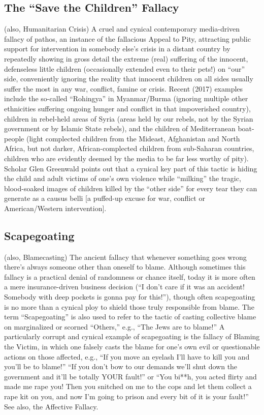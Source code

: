 \documentclass[10pt,a4paper,british]{article}
\begin{document}
\begin{multicols}{2}
    \subsection{The ``Save the Children'' Fallacy} (also, Humanitarian Crisis) A cruel and cynical contemporary media{-}driven fallacy of pathos, an instance of the fallacious Appeal to Pity, attracting public support for intervention in somebody else's crisis in a distant country by repeatedly showing in gross detail the extreme (real) suffering of the innocent, defenseless little children (occasionally extended even to their pets!) on ``our'' side, conveniently ignoring the reality that innocent children on all sides usually suffer the most in any war, conflict, famine or crisis.  Recent (2017) examples include the so{-}called ``Rohingya'' in Myanmar/Burma (ignoring multiple other ethnicities suffering ongoing hunger and conflict in that impoverished country), children in rebel{-}held areas of Syria (areas held by our rebels, not by the Syrian government or by Islamic State rebels), and the children of Mediterranean boat{-}people (light complected children from the Mideast, Afghanistan and North Africa, but not darker, African{-}complected children from sub{-}Saharan countries, children who are evidently deemed by the media to be far less worthy of pity). Scholar Glen Greenwald points out that a cynical key part of this tactic is hiding the child and adult victims of one's own violence while ``milking'' the tragic, blood{-}soaked images of children killed by the ``other side'' for every tear they can generate as a causus belli [a puffed{-}up excuse for war, conflict or American/Western intervention].  

    \subsection{Scapegoating} (also, Blamecasting) The ancient fallacy that whenever something goes wrong there's always someone other than oneself to blame. Although sometimes this fallacy is a practical denial of randomness or chance itself, today it is more often a mere insurance{-}driven business decision (``I don't care if it was an accident! Somebody with deep pockets is gonna pay for this!''), though often scapegoating is no more than a cynical ploy to shield those truly responsible from blame. The term ``Scapegoating'' is also used to refer to the tactic of casting collective blame on marginalized or scorned ``Others,'' e.g., ``The Jews are to blame!'' A particularly corrupt and cynical example of scapegoating is the fallacy of Blaming the Victim, in which one falsely casts the blame for one's own evil or questionable actions on those affected, e.g., ``If you move an eyelash I'll have to kill you and you'll be to blame!'' ``If you don't bow to our demands we'll shut down the government and it'll be totally YOUR fault!'' or ``You bi**h, you acted flirty and made me rape you! Then you snitched on me to the cops and let them collect a rape kit on you, and now I'm going to prison and every bit of it is your fault!'' See also, the Affective Fallacy.  


\end{multicols}
\end{document}
